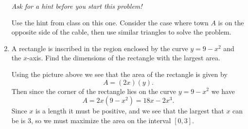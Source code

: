 \documentclass[11pt]{article}
\begin{document}
\begin{enumerate}
\begin{center}
    \textit{Ask for a hint before you start this problem!}
  \end{center}
  \vfill
  {\color{blue}

    Use the hint from class on this one.  Consider the case where town
    $A$ is on the opposite side of the cable, then use similar
    triangles to solve the problem.

  }
  \vfill


  \newpage

\item A rectangle is inscribed in the region enclosed by the curve
  $y=9-x^2$ and the $x$-axis.  Find the dimensions of the rectangle
  with the largest area.

  \begin{center}
  \end{center}
  

  \vfill
  {\color{blue}

    Using the picture above we see that the area of the rectangle is
    given by
    \[
    A = (2x)(y).
    \]
    Then since the corner of the rectangle lies on the curve $y=9-x^2$ we have
    \[
    A = 2x(9-x^2) = 18x - 2x^3.
    \]
    Since $x$ is a length it must be positive, and we see that the
    largest that $x$ can be is 3, so we must maximize the area on the
    interval $[0,3]$.

  }
  \vfill



\end{enumerate}
\end{document}
